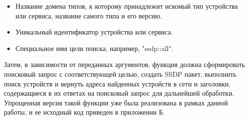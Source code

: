 \begin{itemize}
	\item Название домена типов, к которому принадлежит искомый тип устройства или сервиса, название самого типа и его версию.
	\item Уникальный идентификатор устройства или сервиса.
	\item Специальное имя цели поиска, например, "ssdp::all".
\end{itemize}

Затем, в зависимости от переданных аргументов, функция должна сформировать поисковый запрос с соответствующей целью, создать SSDP пакет, выполнить поиск устройств и вернуть адреса найденных устройств в сети и заголовки, содержащиеся в их ответах на поисковый запрос для дальнейшей обработки.
Упрощенная версия такой функции уже была реализована в рамках данной работы, и ее исходный код приведен в приложении Б.
